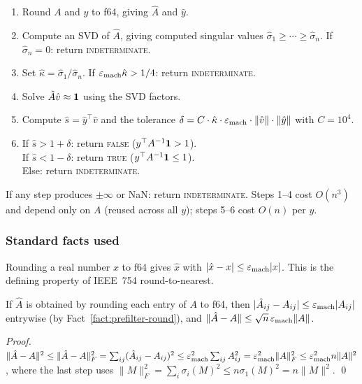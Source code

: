 \begin{enumerate}
\item Round $A$ and $y$ to f64, giving $\hat{A}$ and $\hat{y}$.
\item Compute an SVD of $\hat{A}$, giving computed singular values
  $\hat\sigma_1 \ge \cdots \ge \hat\sigma_n$.
  If $\hat\sigma_n = 0$: return \textsc{indeterminate}.
\item Set $\hat\kappa = \hat\sigma_1 / \hat\sigma_n$.
  If $\varepsilon_{\mathrm{mach}} \hat\kappa > 1/4$: return \textsc{indeterminate}.
\item Solve $\hat{A}\hat{v} \approx \mathbf{1}$ using the SVD factors.
\item Compute $\hat{s} = \hat{y}^\top\hat{v}$ and the tolerance
  $\delta = C \cdot \hat\kappa \cdot \varepsilon_{\mathrm{mach}}
  \cdot \|\hat{v}\| \cdot \|\hat{y}\|$
  with $C = 10^4$.
\item If $\hat{s} > 1 + \delta$: return \textsc{false}
  ($y^\top A^{-1}\mathbf{1} > 1$).\\
  If $\hat{s} < 1 - \delta$: return \textsc{true}
  ($y^\top A^{-1}\mathbf{1} \le 1$).\\
  Else: return \textsc{indeterminate}.
\end{enumerate}

If any step produces $\pm\infty$ or NaN: return
\textsc{indeterminate}.
Steps 1--4 cost $O(n^3)$ and depend only on $A$
(reused across all $y$);
steps 5--6 cost $O(n)$ per $y$.

\subsubsection*{Standard facts used}

\begin{unverified}
\begin{fact}\label{fact:prefilter-round}
Rounding a real number $x$ to f64 gives $\hat{x}$
with $|\hat{x} - x| \le \varepsilon_{\mathrm{mach}}|x|$.
This is the defining property of IEEE~754 round-to-nearest.
\end{fact}
\end{unverified}

\begin{unverified}
\begin{fact}\label{fact:prefilter-cast}
If $\hat{A}$ is obtained by rounding each entry of $A$
to f64, then $|\hat{A}_{ij} - A_{ij}| \le \varepsilon_{\mathrm{mach}}|A_{ij}|$
entrywise (by Fact~\ref{fact:prefilter-round}), and
$\|\hat{A} - A\| \le \sqrt{n}\,\varepsilon_{\mathrm{mach}}\|A\|$.

\emph{Proof.}
$\|\hat{A} - A\|^2 \le \|\hat{A} - A\|_F^2
= \sum_{ij}(\hat{A}_{ij} - A_{ij})^2
\le \varepsilon_{\mathrm{mach}}^2 \sum_{ij} A_{ij}^2
= \varepsilon_{\mathrm{mach}}^2\|A\|_F^2 \le \varepsilon_{\mathrm{mach}}^2 n\|A\|^2$,
where the last step uses
$\|M\|_F^2 = \sum_i \sigma_i(M)^2 \le n\sigma_1(M)^2
= n\|M\|^2$. \qed
\end{fact}
\end{unverified}

